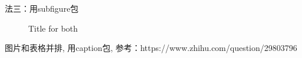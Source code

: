 \documentclass{article}
\begin{document}
\begin{CJK}{UTF8}{gbsn}
法三：用subfigure包
\begin{figure}
	\hfill
	\hfill
	\hfill
	\caption{Title for both}
\end{figure}



图片和表格并排, 用caption包, 参考：https://www.zhihu.com/question/29803796


\end{CJK}
\end{document}
